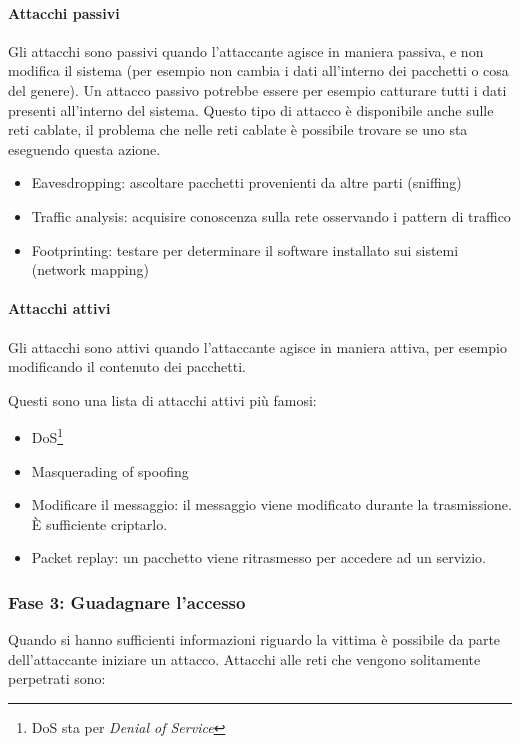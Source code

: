\paragraph*{Attacchi passivi}

Gli attacchi sono passivi quando l'attaccante agisce in maniera passiva, e non 
modifica il sistema (per esempio non cambia i dati all'interno dei pacchetti o 
cosa del genere). Un attacco passivo potrebbe essere per esempio catturare 
tutti i dati presenti all'interno del sistema. Questo tipo di attacco è 
disponibile anche sulle reti cablate, il problema che nelle reti cablate è 
possibile trovare se uno sta eseguendo questa azione.

\begin{itemize}
\item Eavesdropping: ascoltare pacchetti provenienti da altre parti (sniffing)
\item Traffic analysis: acquisire conoscenza sulla rete osservando i pattern di 
traffico
\item Footprinting: testare per determinare il software installato sui sistemi 
(network mapping)
\end{itemize}

\paragraph*{Attacchi attivi}

Gli attacchi sono attivi quando l'attaccante agisce in maniera attiva, per 
esempio modificando il contenuto dei pacchetti.

Questi sono una lista di attacchi attivi più famosi:
\begin{itemize}
\item DoS\footnote{DoS sta per \textit{Denial of Service}}
\item Masquerading of spoofing
\item Modificare il messaggio: il messaggio viene modificato durante la 
trasmissione. È sufficiente criptarlo.
\item Packet replay: un pacchetto viene ritrasmesso per accedere ad un servizio.
\end{itemize}

\subsubsection{Fase 3: Guadagnare l'accesso}

Quando si hanno sufficienti informazioni riguardo la vittima è possibile da 
parte dell'attaccante iniziare un attacco.
Attacchi alle reti che vengono solitamente perpetrati sono:

